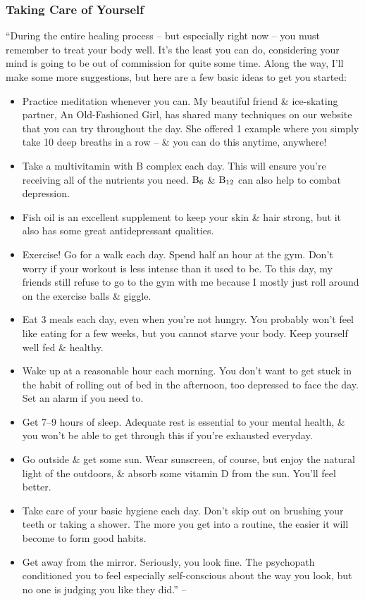 \documentclass{article}
\numberwithin{equation}{section}
\begin{document}
\subsubsection{Taking Care of Yourself}
``During the entire healing process -- but especially right now -- you must remember to treat your body well. It's the least you can do, considering your mind is going to be out of commission for quite some time. Along the way, I'll make some more suggestions, but here are a few basic ideas to get you started:
\begin{itemize}
	\item Practice meditation whenever you can. My beautiful friend \& ice-skating partner, An Old-Fashioned Girl, has shared many techniques on our website that you can try throughout the day. She offered 1 example where you simply take 10 deep breaths in a row -- \& you can do this anytime, anywhere!
	\item Take a multivitamin with B complex each day. This will ensure you're receiving all of the nutrients you need. $\rm B_6$ \& $\rm B_{12}$ can also help to combat depression.
	\item Fish oil is an excellent supplement to keep your skin \& hair strong, but it also has some great antidepressant qualities.
	\item Exercise! Go for a walk each day. Spend half an hour at the gym. Don't worry if your workout is less intense than it used to be. To this day, my friends still refuse to go to the gym with me because I mostly just roll around on the exercise balls \& giggle.
	\item Eat 3 meals each day, even when you're not hungry. You probably won't feel like eating for a few weeks, but you cannot starve your body. Keep yourself well fed \& healthy.
	\item Wake up at a reasonable hour each morning. You don't want to get stuck in the habit of rolling out of bed in the afternoon, too depressed to face the day. Set an alarm if you need to.
	\item Get 7--9 hours of sleep. Adequate rest is essential to your mental health, \& you won't be able to get through this if you're exhausted everyday.
	\item Go outside \& get some sun. Wear sunscreen, of course, but enjoy the natural light of the outdoors, \& absorb some vitamin D from the sun. You'll feel better.
	\item Take care of your basic hygiene each day. Don't skip out on brushing your teeth or taking a shower. The more you get into a routine, the easier it will become to form good habits.
	\item Get away from the mirror. Seriously, you look fine. The psychopath conditioned you to feel especially self-conscious about the way you look, but no one is judging you like they did.'' -- \cite[pp. 93--94]{MacKenzie2015}
\end{itemize}
\end{document}
